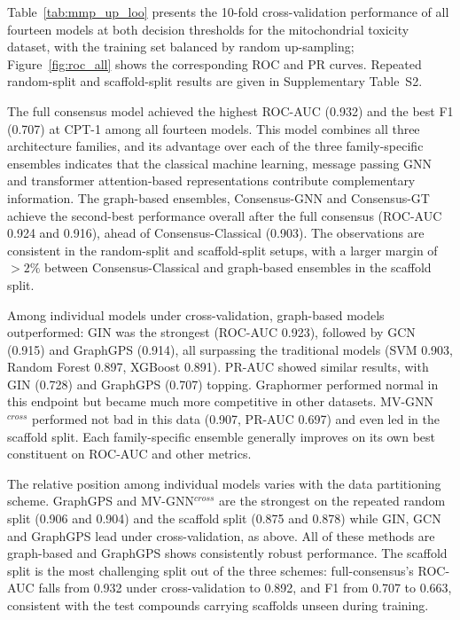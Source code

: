 \documentclass[letterpaper]{article}
\begin{document}
Table~\ref{tab:mmp_up_loo} presents the 10-fold cross-validation performance of all fourteen models at both decision thresholds for the mitochondrial toxicity dataset, with the training set balanced by random up-sampling; Figure~\ref{fig:roc_all} shows the corresponding ROC and PR curves. Repeated random-split and scaffold-split results are given in Supplementary Table~S2.

The full consensus model achieved the highest ROC-AUC (0.932) and the best F1 (0.707) at CPT-1 among all fourteen models. This model combines all three architecture families, and its advantage over each of the three family-specific ensembles indicates that the classical machine learning, message passing GNN and transformer attention-based representations contribute complementary information. The graph-based ensembles, Consensus-GNN and Consensus-GT achieve the second-best performance overall after the full consensus (ROC-AUC 0.924 and 0.916), ahead of Consensus-Classical (0.903). The observations are consistent in the random-split and scaffold-split setups, with a larger margin of $>2\%$ between Consensus-Classical and graph-based ensembles in the scaffold split.

Among individual models under cross-validation, graph-based models outperformed: GIN was the strongest (ROC-AUC 0.923), followed by GCN (0.915) and GraphGPS (0.914), all surpassing the traditional models (SVM 0.903, Random Forest 0.897, XGBoost 0.891). PR-AUC showed similar results, with GIN (0.728) and GraphGPS (0.707) topping. Graphormer performed normal in this endpoint but became much more competitive in other datasets. MV-GNN$^{cross}$ performed not bad in this data (0.907, PR-AUC 0.697) and even led in the scaffold split. Each family-specific ensemble generally improves on its own best constituent on ROC-AUC and other metrics.

The relative position among individual models varies with the data partitioning scheme. GraphGPS and MV-GNN$^{cross}$ are the strongest on the repeated random split (0.906 and 0.904) and the scaffold split
(0.875 and 0.878) while GIN, GCN and GraphGPS lead under cross-validation, as above. All of these methods are graph-based and GraphGPS shows consistently robust performance. The scaffold split is the most challenging split out of the three schemes: full-consensus's ROC-AUC falls from 0.932 under cross-validation to 0.892, and
F1 from 0.707 to 0.663, consistent with the test compounds carrying scaffolds unseen during training.
\end{document}

